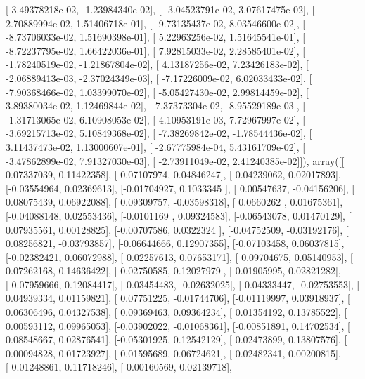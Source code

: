 \documentclass{article}
\begin{document}
       [  3.49378218e-02,  -1.23984340e-02],
       [ -3.04523791e-02,   3.07617475e-02],
       [  2.70889994e-02,   1.51406718e-01],
       [ -9.73135437e-02,   8.03546600e-02],
       [ -8.73706033e-02,   1.51690398e-01],
       [  5.22963256e-02,   1.51645541e-01],
       [ -8.72237795e-02,   1.66422036e-01],
       [  7.92815033e-02,   2.28585401e-02],
       [ -1.78240519e-02,  -1.21867804e-02],
       [  4.13187256e-02,   7.23426183e-02],
       [ -2.06889413e-03,  -2.37024349e-03],
       [ -7.17226009e-02,   6.02033433e-02],
       [ -7.90368466e-02,   1.03399070e-02],
       [ -5.05427430e-02,   2.99814459e-02],
       [  3.89380034e-02,   1.12469844e-02],
       [  7.37373304e-02,  -8.95529189e-03],
       [ -1.31713065e-02,   6.10908053e-02],
       [  4.10953191e-03,   7.72967997e-02],
       [ -3.69215713e-02,   5.10849368e-02],
       [ -7.38269842e-02,  -1.78544436e-02],
       [  3.11437473e-02,   1.13000607e-01],
       [ -2.67775984e-04,   5.43161709e-02],
       [ -3.47862899e-02,   7.91327030e-03],
       [ -2.73911049e-02,   2.41240385e-02]]), array([[ 0.07337039,  0.11422358],
       [ 0.07107974,  0.04846247],
       [ 0.04239062,  0.02017893],
       [-0.03554964,  0.02369613],
       [-0.01704927,  0.1033345 ],
       [ 0.00547637, -0.04156206],
       [ 0.08075439,  0.06922088],
       [ 0.09309757, -0.03598318],
       [ 0.0660262 ,  0.01675361],
       [-0.04088148,  0.02553436],
       [-0.0101169 ,  0.09324583],
       [-0.06543078,  0.01470129],
       [ 0.07935561,  0.00128825],
       [-0.00707586,  0.0322324 ],
       [-0.04752509, -0.03192176],
       [ 0.08256821, -0.03793857],
       [-0.06644666,  0.12907355],
       [-0.07103458,  0.06037815],
       [-0.02382421,  0.06072988],
       [ 0.02257613,  0.07653171],
       [ 0.09704675,  0.05140953],
       [ 0.07262168,  0.14636422],
       [ 0.02750585,  0.12027979],
       [-0.01905995,  0.02821282],
       [-0.07959666,  0.12084417],
       [ 0.03454483, -0.02632025],
       [ 0.04333447, -0.02753553],
       [ 0.04939334,  0.01159821],
       [ 0.07751225, -0.01744706],
       [-0.01119997,  0.03918937],
       [ 0.06306496,  0.04327538],
       [ 0.09369463,  0.09364234],
       [ 0.01354192,  0.13785522],
       [ 0.00593112,  0.09965053],
       [-0.03902022, -0.01068361],
       [-0.00851891,  0.14702534],
       [ 0.08548667,  0.02876541],
       [-0.05301925,  0.12542129],
       [ 0.02473899,  0.13807576],
       [ 0.00094828,  0.01723927],
       [ 0.01595689,  0.06724621],
       [ 0.02482341,  0.00200815],
       [-0.01248861,  0.11718246],
       [-0.00160569,  0.02139718],
\end{document}
